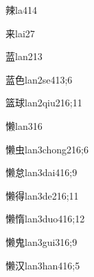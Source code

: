 \begin{verbete}{辣}{la4}{14}
\end{verbete}

\begin{verbete}{来}{lai2}{7}
\end{verbete}

\begin{verbete}{蓝}{lan2}{13}
\end{verbete}

\begin{verbete}{蓝色}{lan2se4}{13;6}
\end{verbete}

\begin{verbete}{篮球}{lan2qiu2}{16;11}
\end{verbete}

\begin{verbete}{懒}{lan3}{16}
\end{verbete}

\begin{verbete}{懒虫}{lan3chong2}{16;6}
\end{verbete}

\begin{verbete}{懒怠}{lan3dai4}{16;9}
\end{verbete}

\begin{verbete}{懒得}{lan3de2}{16;11}
\end{verbete}

\begin{verbete}{懒惰}{lan3duo4}{16;12}
\end{verbete}

\begin{verbete}{懒鬼}{lan3gui3}{16;9}
\end{verbete}

\begin{verbete}{懒汉}{lan3han4}{16;5}
\end{verbete}

